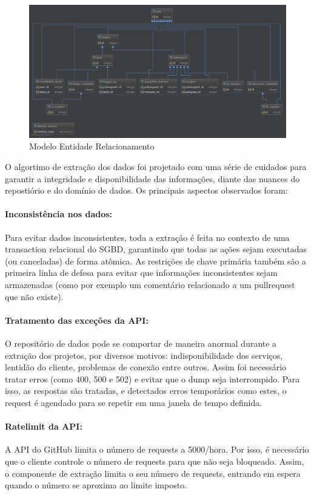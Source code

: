 \documentclass[sigconf]{acmart}
\begin{document}
\begin{figure}[!htbp]
 \includegraphics[width=\textwidth]{mer}
 \caption{Modelo Entidade Relacionamento}\label{fig:mer}
\end{figure}

O algortimo de extração dos dados foi projetado com uma série de cuidados para garantir a integridade e disponibilidade das informações, diante das nuances do repostiório e do domínio de dados. Os principais aspectos observados foram:

\paragraph{Inconsistência nos dados: } Para evitar dados inconsistentes, toda a extração é feita no contexto de uma transaction relacional do SGBD, garantindo que todas as ações sejam executadas (ou canceladas) de forma atômica. As restrições de chave primária também são a primeira linha de defesa para evitar que informações inconsistentes sejam armazenadas (como por exemplo um comentário relacionado a um pullrequest que não existe).

\paragraph{Tratamento das exceções da API: } O repositório de dados pode se comportar de maneira anormal durante a extração dos projetos, por diversos motivos: indisponibilidade dos serviços, lentidão do cliente, problemas de conexão entre outros. Assim foi necessário tratar erros (como 400, 500 e 502) e evitar que o dump seja interrompido. Para isso, as respostas são tratadas, e detectados erros temporários como estes, o request é agendado para se repetir em uma janela de tempo definida.

\paragraph{Ratelimit da API: } A API do GitHub limita o número de requests a 5000/hora. Por isso, é necessário que o cliente controle o número de requests para que não seja bloqueado. Assim, o componente de extração limita o seu número de requests, entrando em espera quando o número se aproxima ao limite imposto.
\end{document}
